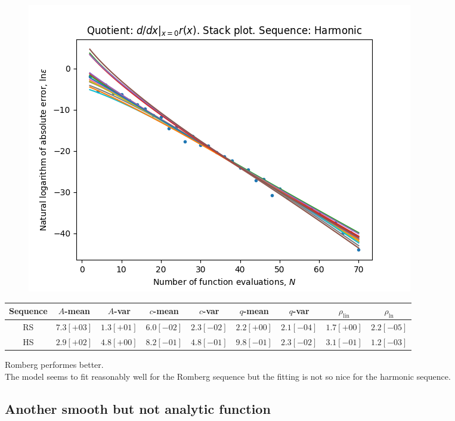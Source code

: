 \begin{figure}[H]
\centering
\begin{minipage}{0.45\textwidth}
\centering
\includegraphics[scale=0.45]{../results/diff_quot_plots/rho_hp_harmonic_stack.png}
\end{minipage}
\end{figure}

\begin{table}[H]
    \centering
    \small
    \begin{tabular}{c||c|c|c|c|c|c|c|c}
Sequence & \(A\)-mean & \(A\)-var & \(c\)-mean & \(c\)-var & \(q\)-mean & \(q\)-var & \(\rho_{\operatorname{lin}}\) & \(\rho_{\ln}\)\\\hline
\rowcolor{green}
RS & \(7.3[+03]\) & \(1.3[+01]\) & \(6.0[-02]\) & \(2.3[-02]\) & \(2.2[+00]\) & \(2.1[-04]\) & \(1.7[+00]\) & \(2.2[-05]\) \\
\rowcolor{red}
HS & \(2.9[+02]\) & \(4.8[+00]\) & \(8.2[-01]\) & \(4.8[-01]\) & \(9.8[-01]\) & \(2.3[-02]\) & \(3.1[-01]\) & \(1.2[-03]\) \\
    \end{tabular}
    \label{tab:my_label}
\end{table}

Romberg performes better.\\

The model seems to fit reasonably well for the Romberg sequence but the fitting is not so nice for the harmonic sequence.

\subsection{Another smooth but not analytic function}

